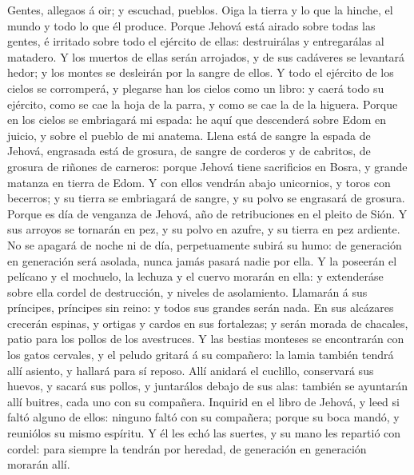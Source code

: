  Gentes, allegaos á oir; y escuchad, pueblos. Oiga la
tierra y lo que la hinche, el mundo y todo lo que él produce.
 Porque Jehová está airado sobre todas las gentes, é
irritado sobre todo el ejército de ellas: destruirálas y entregarálas al
matadero.  Y los muertos de ellas serán arrojados, y de
sus cadáveres se levantará hedor; y los montes se desleirán por la
sangre de ellos.  Y todo el ejército de los cielos se
corromperá, y plegarse han los cielos como un libro: y caerá todo su
ejército, como se cae la hoja de la parra, y como se cae la de la
higuera.  Porque en los cielos se embriagará mi espada: he
aquí que descenderá sobre Edom en juicio, y sobre el pueblo de mi
anatema.  Llena está de sangre la espada de Jehová,
engrasada está de grosura, de sangre de corderos y de cabritos, de
grosura de riñones de carneros: porque Jehová tiene sacrificios en
Bosra, y grande matanza en tierra de Edom.  Y con ellos
vendrán abajo unicornios, y toros con becerros; y su tierra se
embriagará de sangre, y su polvo se engrasará de grosura. 
Porque es día de venganza de Jehová, año de retribuciones en el pleito
de Sión.  Y sus arroyos se tornarán en pez, y su polvo en
azufre, y su tierra en pez ardiente.  No se apagará de
noche ni de día, perpetuamente subirá su humo: de generación en
generación será asolada, nunca jamás pasará nadie por ella.
 Y la poseerán el pelícano y el mochuelo, la lechuza y el
cuervo morarán en ella: y extenderáse sobre ella cordel de destrucción,
y niveles de asolamiento.  Llamarán á sus príncipes,
príncipes sin reino: y todos sus grandes serán nada.  En
sus alcázares crecerán espinas, y ortigas y cardos en sus fortalezas; y
serán morada de chacales, patio para los pollos de los avestruces.
 Y las bestias monteses se encontrarán con los gatos
cervales, y el peludo gritará á su compañero: la lamia también tendrá
allí asiento, y hallará para sí reposo.  Allí anidará el
cuclillo, conservará sus huevos, y sacará sus pollos, y juntarálos
debajo de sus alas: también se ayuntarán allí buitres, cada uno con su
compañera.  Inquirid en el libro de Jehová, y leed si
faltó alguno de ellos: ninguno faltó con su compañera; porque su boca
mandó, y reuniólos su mismo espíritu.  Y él les echó las
suertes, y su mano les repartió con cordel: para siempre la tendrán por
heredad, de generación en generación morarán allí.

